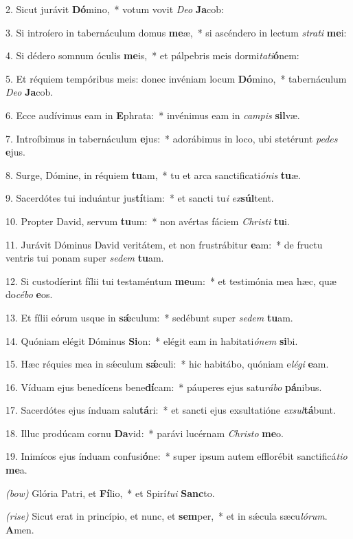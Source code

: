 2. Sicut jurávit \textbf{Dó}mino,~* votum vovit \textit{De}\textit{o} \textbf{Ja}cob:

3. Si introíero in tabernáculum domus \textbf{me}æ,~* si ascéndero in lectum \textit{stra}\textit{ti} \textbf{me}i:

4. Si dédero somnum óculis \textbf{me}is,~* et pálpebris meis dormi\textit{ta}\textit{ti}\textbf{ó}nem:

5. Et réquiem tempóribus meis: donec invéniam locum \textbf{Dó}mino,~* tabernáculum \textit{De}\textit{o} \textbf{Ja}cob.

6. Ecce audívimus eam in \textbf{E}phrata:~* invénimus eam in \textit{cam}\textit{pis} \textbf{sil}væ.

7. Introíbimus in tabernáculum \textbf{e}jus:~* adorábimus in loco, ubi stetérunt \textit{pe}\textit{des} \textbf{e}jus.

8. Surge, Dómine, in réquiem \textbf{tu}am,~* tu et arca sanctificati\textit{ó}\textit{nis} \textbf{tu}æ.

9. Sacerdótes tui induántur jus\textbf{tí}tiam:~* et sancti tu\textit{i} \textit{ex}\textbf{súl}tent.

10. Propter David, servum \textbf{tu}um:~* non avértas fáciem \textit{Chris}\textit{ti} \textbf{tu}i.

11. Jurávit Dóminus David veritátem, et non frustrábitur \textbf{e}am:~* de fructu ventris tui ponam super \textit{se}\textit{dem} \textbf{tu}am.

12. Si custodíerint fílii tui testaméntum \textbf{me}um:~* et testimónia mea hæc, quæ do\textit{cé}\textit{bo} \textbf{e}os.

13. Et fílii eórum usque in \textbf{s\'{\ae}}culum:~* sedébunt super \textit{se}\textit{dem} \textbf{tu}am.

14. Quóniam elégit Dóminus \textbf{Si}on:~* elégit eam in habitati\textit{ó}\textit{nem} \textbf{si}bi.

15. Hæc réquies mea in s\'{\ae}culum \textbf{s\'{\ae}}culi:~* hic habitábo, quóniam e\textit{lé}\textit{gi} \textbf{e}am.

16. Víduam ejus benedícens bene\textbf{dí}cam:~* páuperes ejus satu\textit{rá}\textit{bo} \textbf{pá}nibus.

17. Sacerdótes ejus índuam salu\textbf{tá}ri:~* et sancti ejus exsultatióne \textit{ex}\textit{sul}\textbf{tá}bunt.

18. Illuc prodúcam cornu \textbf{Da}vid:~* parávi lucérnam \textit{Chris}\textit{to} \textbf{me}o.

19. Inimícos ejus índuam confusi\textbf{ó}ne:~* super ipsum autem efflorébit sanctificá\textit{ti}\textit{o} \textbf{me}a.

\textit{(bow)} Glória Patri, et \textbf{Fí}lio,~* et Spirí\textit{tu}\textit{i} \textbf{Sanc}to.

\textit{(rise)} Sicut erat in princípio, et nunc, et \textbf{sem}per,~* et in s\'{\ae}cula sæcu\textit{ló}\textit{rum}. \textbf{A}men.